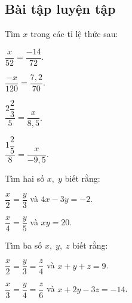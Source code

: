\subsection{Bài tập luyện tập}
\begin{bt}%
	Tìm $x$ trong các tỉ lệ thức sau:
	\begin{listEX}[4]
		\item $\dfrac{x}{52} = \dfrac{-14}{72}$.
		\item $\dfrac{-x}{120} = \dfrac{7,2}{70}$.
		\item $\dfrac{2\dfrac{2}{3}}{5} = \dfrac{x}{8,5}$.
		\item $\dfrac{1\dfrac{2}{5}}{8} = \dfrac{x}{-9,5}$.
	\end{listEX}
\end{bt}

\begin{bt}%
	Tìm hai số $x, \; y$ biết rằng:
	\begin{listEX}[2]
		\item $\dfrac{x}{2} = \dfrac{y}{3}$ và $4x-3y=-2$.
		\item $\dfrac{x}{4} = \dfrac{y}{5}$ và $xy=20$.
	\end{listEX}
\end{bt}

\begin{bt}%
	Tìm ba số $x, \; y, \; z$ biết rằng:
	\begin{listEX}[2]
		\item $\dfrac{x}{2} = \dfrac{y}{3} = \dfrac{z}{4}$ và $x+y+z=9$.
		\item $\dfrac{x}{3} = \dfrac{y}{4} = \dfrac{z}{6}$ và $x+2y-3z=-14$.
	\end{listEX}
\end{bt}

